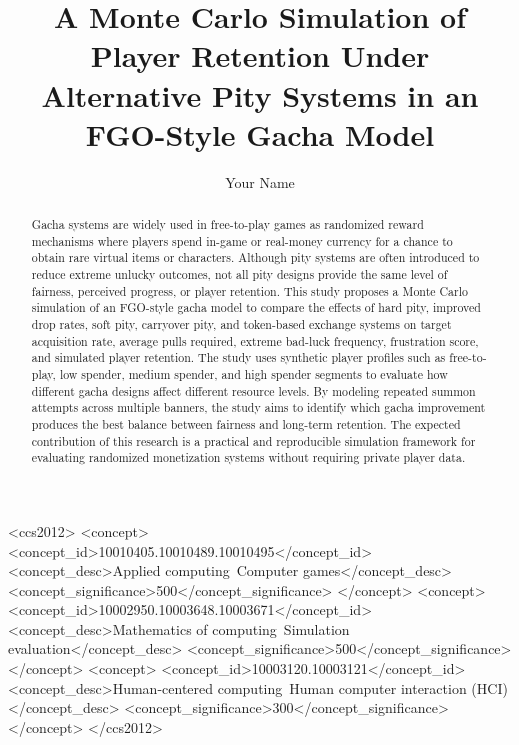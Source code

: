 \documentclass[sigconf,nonacm]{acmart}
\title{A Monte Carlo Simulation of Player Retention Under Alternative Pity Systems in an FGO-Style Gacha Model}
\author{Your Name}
\affiliation{%
  \institution{Your University}
  \city{Makati}
  \country{Philippines}
}
\begin{document}
\begin{abstract}
Gacha systems are widely used in free-to-play games as randomized reward mechanisms where players spend in-game or real-money currency for a chance to obtain rare virtual items or characters. Although pity systems are often introduced to reduce extreme unlucky outcomes, not all pity designs provide the same level of fairness, perceived progress, or player retention. This study proposes a Monte Carlo simulation of an FGO-style gacha model to compare the effects of hard pity, improved drop rates, soft pity, carryover pity, and token-based exchange systems on target acquisition rate, average pulls required, extreme bad-luck frequency, frustration score, and simulated player retention. The study uses synthetic player profiles such as free-to-play, low spender, medium spender, and high spender segments to evaluate how different gacha designs affect different resource levels. By modeling repeated summon attempts across multiple banners, the study aims to identify which gacha improvement produces the best balance between fairness and long-term retention. The expected contribution of this research is a practical and reproducible simulation framework for evaluating randomized monetization systems without requiring private player data.
\end{abstract}

\begin{CCSXML}
<ccs2012>
 <concept>
  <concept_id>10010405.10010489.10010495</concept_id>
  <concept_desc>Applied computing~Computer games</concept_desc>
  <concept_significance>500</concept_significance>
 </concept>
 <concept>
  <concept_id>10002950.10003648.10003671</concept_id>
  <concept_desc>Mathematics of computing~Simulation evaluation</concept_desc>
  <concept_significance>500</concept_significance>
 </concept>
 <concept>
  <concept_id>10003120.10003121</concept_id>
  <concept_desc>Human-centered computing~Human computer interaction (HCI)</concept_desc>
  <concept_significance>300</concept_significance>
 </concept>
</ccs2012>
\end{CCSXML}


\end{document}
